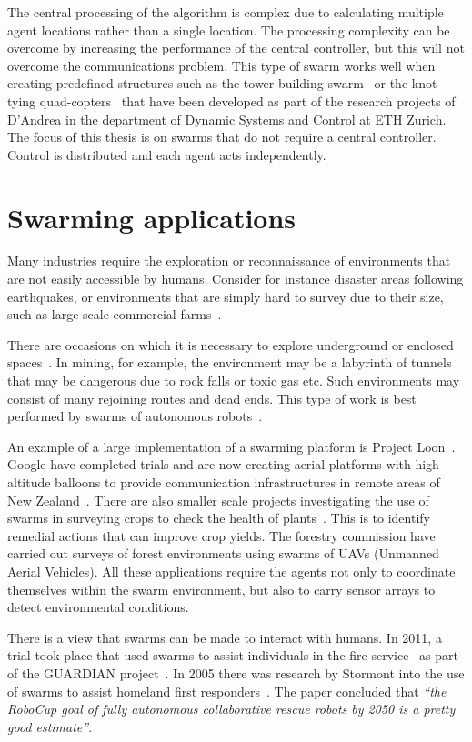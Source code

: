 The central processing of the algorithm is complex due to calculating multiple agent locations rather than a single location. The processing complexity can be overcome by increasing the performance of the central controller, but this will not overcome the communications problem. 
This type of swarm works well when creating predefined structures such as the tower building swarm~\cite{EG:11} or the knot tying quad-copters~\cite{AZMD:15} that have been developed as part of the research projects of D'Andrea in the department of Dynamic Systems and Control at ETH Zurich. The focus of this thesis  is on swarms that do not require a central controller. Control is distributed and each agent acts independently.

\section{Swarming applications}\label{sec:SwarmApplications} 
Many industries require the exploration or reconnaissance of environments that are not easily accessible by humans. Consider for instance disaster areas following earthquakes, or environments that are simply hard to survey due to their size, such as large scale commercial farms~\cite{BSB:15, HGCTREA:15}. 

There are occasions on which it is necessary to explore underground or enclosed spaces~\cite{IBE:08}. In mining, for example, the environment may be a labyrinth of tunnels that may be dangerous due to rock falls or toxic gas etc. Such environments may consist of many rejoining routes and dead ends. This type of work is best performed by swarms of autonomous robots~\cite{LG:14}.

An example of a large implementation of a swarming platform is Project Loon~\cite{KS:ND, G:13, RAV:13}. Google have completed trials and are now creating aerial platforms with high altitude balloons to provide communication infrastructures in remote areas of New Zealand~\cite{CBS:13, NZH:13}. There are also smaller scale projects investigating the use of swarms in surveying crops to check the health of plants~\cite{BSB:15}. This is to identify remedial actions that can improve crop yields. The forestry commission have carried out surveys of forest environments using swarms of UAVs (Unmanned Aerial Vehicles). All these applications require the agents not only to coordinate themselves within the swarm environment, but also to carry sensor arrays to detect environmental conditions.

There is a view that swarms can be made to interact with humans. In 2011, a trial took place that used swarms to assist individuals in the fire service~\cite{PAWN:11} as part of the GUARDIAN project~\cite{SALGVPJ:08}. In 2005 there was research by Stormont into the use of swarms to assist homeland first responders~\cite{STO:05}. The paper concluded that \emph{``the RoboCup goal of fully autonomous collaborative rescue robots by 2050 is a pretty good estimate''}.

